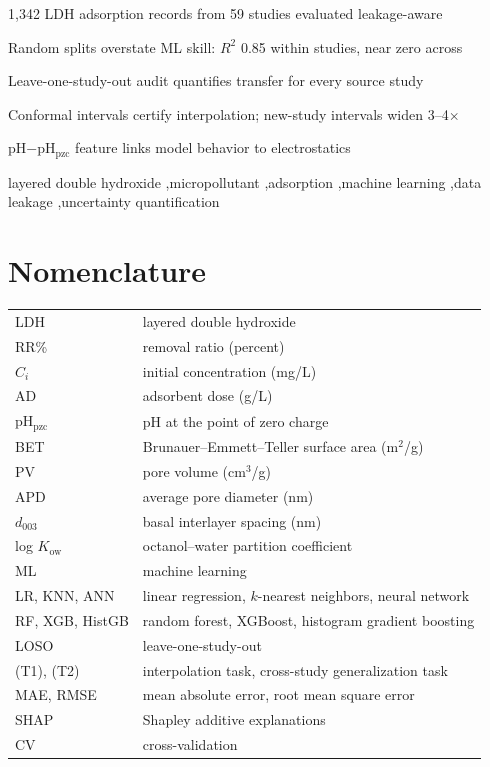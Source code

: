 \documentclass[review,12pt,authoryear]{elsarticle}
\begin{document}
\begin{frontmatter}

\begin{highlights}
\item 1,342 LDH adsorption records from 59 studies evaluated leakage-aware
\item Random splits overstate ML skill: $R^2$ 0.85 within studies, near zero across
\item Leave-one-study-out audit quantifies transfer for every source study
\item Conformal intervals certify interpolation; new-study intervals widen 3--4$\times$
\item pH$-$pH$_{\mathrm{pzc}}$ feature links model behavior to electrostatics
\end{highlights}

\begin{keyword}
layered double hydroxide \sep micropollutant \sep adsorption \sep machine
learning \sep data leakage \sep uncertainty quantification
\end{keyword}

\end{frontmatter}

\section*{Nomenclature}
\begin{tabular}{@{}ll@{}}
LDH & layered double hydroxide \\
RR\% & removal ratio (percent) \\
$C_i$ & initial concentration (mg/L) \\
AD & adsorbent dose (g/L) \\
pH$_{\mathrm{pzc}}$ & pH at the point of zero charge \\
BET & Brunauer--Emmett--Teller surface area (m$^2$/g) \\
PV & pore volume (cm$^3$/g) \\
APD & average pore diameter (nm) \\
$d_{003}$ & basal interlayer spacing (nm) \\
log $K_{\mathrm{ow}}$ & octanol--water partition coefficient \\
ML & machine learning \\
LR, KNN, ANN & linear regression, $k$-nearest neighbors, neural network \\
RF, XGB, HistGB & random forest, XGBoost, histogram gradient boosting \\
LOSO & leave-one-study-out \\
(T1), (T2) & interpolation task, cross-study generalization task \\
MAE, RMSE & mean absolute error, root mean square error \\
SHAP & Shapley additive explanations \\
CV & cross-validation \\
\end{tabular}
\end{document}
